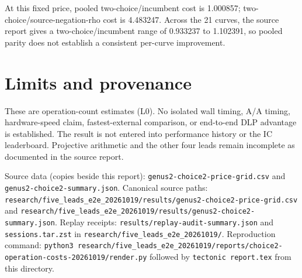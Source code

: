 \documentclass{article}
\begin{document}
At this fixed price, pooled two-choice/incumbent cost is 1.000857; two-choice/source-negation-rho cost is 4.483247. Across the 21 curves, the source report gives a two-choice/incumbent range of 0.933237 to 1.102391, so pooled parity does not establish a consistent per-curve improvement.

\section*{Limits and provenance}
These are operation-count estimates (L0). No isolated wall timing, A/A timing, hardware-speed claim, fastest-external comparison, or end-to-end DLP advantage is established. The result is not entered into performance history or the IC leaderboard. Projective arithmetic and the other four leads remain incomplete as documented in the source report.

Source data (copies beside this report): \texttt{genus2-choice2-price-grid.csv} and \texttt{genus2-choice2-summary.json}. Canonical source paths: \texttt{research/five\_leads\_e2e\_20261019/results/genus2-choice2-price-grid.csv} and \texttt{research/five\_leads\_e2e\_20261019/results/genus2-choice2-summary.json}. Replay receipts: \texttt{results/replay-audit-summary.json} and \texttt{sessions.tar.zst} in \texttt{research/five\_leads\_e2e\_20261019/}. Reproduction command: \texttt{python3 research/five\_leads\_e2e\_20261019/reports/choice2-operation-costs-20261019/render.py} followed by \texttt{tectonic report.tex} from this directory.
\end{document}
